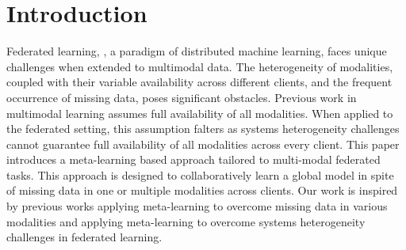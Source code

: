 \documentclass{article} %
\begin{document}
\section{Introduction}

Federated learning, \cite{fedavg}, a paradigm of distributed machine learning, faces unique challenges when extended to multimodal data. The heterogeneity of modalities, coupled with their variable availability across different clients, and the frequent occurrence of missing data, poses significant obstacles. Previous work in multimodal learning assumes full availability of all modalities. When applied to the federated setting, this assumption falters as systems heterogeneity challenges cannot guarantee full availability of all modalities across every client. This paper introduces a meta-learning based approach tailored to multi-modal federated tasks. This approach is designed to collaboratively learn a global model in spite of missing data in one or multiple modalities across clients. Our work is inspired by previous works applying meta-learning to overcome missing data in various modalities and applying meta-learning to overcome systems heterogeneity challenges in federated learning. 







\end{document}
